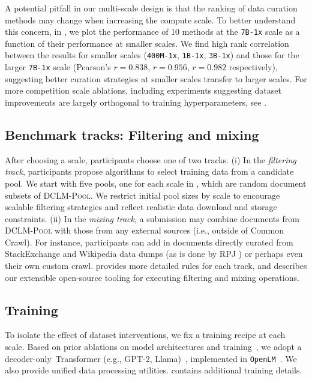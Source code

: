 \documentclass{article}
\newcommand{\rawpool}{\textsc{DCLM-Pool}\xspace}
\newcommand{\xstrack}{\texttt{400M-1x}\xspace}
\newcommand{\strack}{\texttt{1B-1x}\xspace}
\newcommand{\mtrack}{\texttt{3B-1x}\xspace}
\newcommand{\ltrack}{\texttt{7B-1x}\xspace}
\begin{document}
A potential pitfall in our multi-scale design is that the ranking of data curation methods may change when increasing the compute scale.
To better understand this concern, in , we plot the performance of 10 methods at the \ltrack scale as a function of their performance at smaller scales.
We find high rank correlation between the results for smaller scales (\xstrack, \strack, \mtrack) and those for the larger \ltrack scale (Pearson's $r=0.838$, $r=0.956$, $r=0.982$ respectively), suggesting better curation strategies at smaller scales transfer to larger scales.
For more competition scale ablations, including experiments suggesting dataset improvements are largely orthogonal to training hyperparameters, see .


\subsection{Benchmark tracks: Filtering and mixing}
\label{sec:tracks}
After choosing a scale, participants choose one of two tracks.
(i) In the \emph{filtering track}, participants propose algorithms to select training data from a candidate pool.
We start with five pools, one for each scale in , which are random document subsets of \rawpool.
We restrict initial pool sizes by scale to encourage scalable filtering strategies and reflect realistic data download and storage constraints.
(ii) In the \emph{mixing track}, a submission may combine documents from \rawpool with those from any external sources (i.e., outside of Common Crawl).
For instance, participants can add in documents directly curated from StackExchange and Wikipedia data dumps (as is done by RPJ \citep{rpj}) or perhaps even their own custom crawl.
 provides more detailed rules for each track, and  describes our extensible open-source tooling for executing filtering and mixing operations.


\subsection{Training}
\label{sec:training}
To isolate the effect of dataset interventions, we fix a training recipe at each scale.
Based on prior ablations on model architectures and training~\citep{Radford2019LanguageMA,wortsman2023small,gadre2024LanguageMS,scao2022language,chinchilla,gpt3,Chowdhery2022PaLMSL,llama,llama2,llama3}, we adopt a decoder-only~Transformer (e.g., GPT-2, Llama)~\citep{transformer,llama,Radford2019LanguageMA}, implemented in \texttt{OpenLM}~\citep{open_lm}.
We also provide unified data processing utilities.
 contains additional training details.
\end{document}
